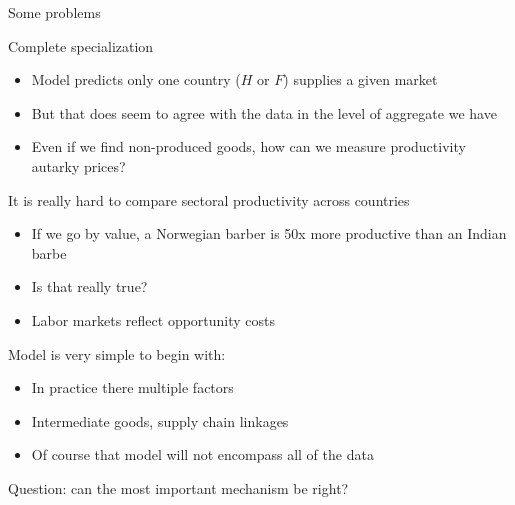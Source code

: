 \documentclass[notes,11pt, aspectratio=169, xcolor=table]{beamer}
\newenvironment{wideitemize}{\itemize\addtolength{\itemsep}{10pt}}{\enditemize}
\begin{document}
\begin{frame}{Some problems}
    \begin{wideitemize}
        \item Complete specialization

        \begin{itemize}
            \item Model predicts only one country ($H$ or $F$) supplies a given market

            \item But that does seem to agree with the data in the level of aggregate we have

            \item Even if we find non-produced goods, how can we measure productivity autarky prices?
        \end{itemize}

        \item It is really hard to compare sectoral productivity across countries

        \begin{itemize}
            \item If we go by value, a Norwegian barber is 50x more productive than an Indian barbe
            \item Is that really true?
            \item Labor markets reflect opportunity costs
        \end{itemize}

        \item Model is very simple to begin with:
        \begin{itemize}
            \item In practice there multiple factors
            \item Intermediate goods, supply chain linkages
            \item Of course that model will not encompass all of the data
        \end{itemize}

        \item Question: can the most important mechanism be right?

    \end{wideitemize}
\end{frame}
\end{document}
